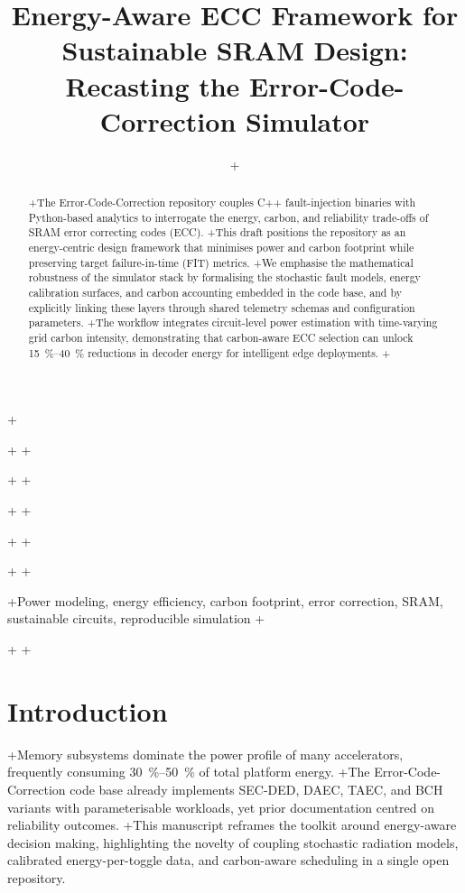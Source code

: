 +\documentclass[conference]{IEEEtran}
\begin{document}
+
+\title{Energy-Aware ECC Framework for Sustainable SRAM Design: Recasting the Error-Code-Correction Simulator}
+
+\author{
+}
+
+\maketitle
+
+\begin{abstract}
+The Error-Code-Correction repository couples C++ fault-injection binaries with Python-based analytics to interrogate the energy, carbon, and reliability trade-offs of SRAM error correcting codes (ECC).
+This draft positions the repository as an energy-centric design framework that minimises power and carbon footprint while preserving target failure-in-time (FIT) metrics.
+We emphasise the mathematical robustness of the simulator stack by formalising the stochastic fault models, energy calibration surfaces, and carbon accounting embedded in the code base, and by explicitly linking these layers through shared telemetry schemas and configuration parameters.
+The workflow integrates circuit-level power estimation with time-varying grid carbon intensity, demonstrating that carbon-aware ECC selection can unlock \SIrange{15}{40}{\percent} reductions in decoder energy for intelligent edge deployments.
+\end{abstract}
+
+\begin{IEEEkeywords}
+Power modeling, energy efficiency, carbon footprint, error correction, SRAM, sustainable circuits, reproducible simulation
+\end{IEEEkeywords}
+
+\section{Introduction}
+Memory subsystems dominate the power profile of many accelerators, frequently consuming \SIrange{30}{50}{\percent} of total platform energy.
+The Error-Code-Correction code base already implements SEC-DED, DAEC, TAEC, and BCH variants with parameterisable workloads, yet prior documentation centred on reliability outcomes.
+This manuscript reframes the toolkit around energy-aware decision making, highlighting the novelty of coupling stochastic radiation models, calibrated energy-per-toggle data, and carbon-aware scheduling in a single open repository.
\end{document}
